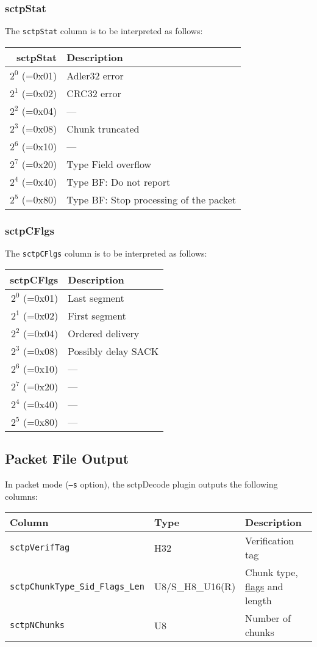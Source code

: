 \documentclass[documentation]{subfiles}
\begin{document}
\subsubsection{sctpStat}\label{sctpStat}
The {\tt sctpStat} column is to be interpreted as follows:
\begin{longtable}{rl}
    \toprule
    {\bf sctpStat} & {\bf Description}\\
    \midrule\endhead%
    $2^0$ (=0x01) & Adler32 error \\
    $2^1$ (=0x02) & CRC32 error\\
    $2^2$ (=0x04) & ---\\
    $2^3$ (=0x08) & Chunk truncated\\
    $2^6$ (=0x10) & ---\\
    $2^7$ (=0x20) & Type Field overflow\\
    $2^4$ (=0x40) & Type BF: Do not report\\
    $2^5$ (=0x80) & Type BF: Stop processing of the packet\\
    \bottomrule
\end{longtable}

\subsubsection{sctpCFlgs}\label{sctpCFlgs}
The {\tt sctpCFlgs} column is to be interpreted as follows:
\begin{longtable}{rl}
    \toprule
    {\bf sctpCFlgs} & {\bf Description}\\
    \midrule\endhead%
    $2^0$ (=0x01) & Last segment \\
    $2^1$ (=0x02) & First segment \\
    $2^2$ (=0x04) & Ordered delivery \\
    $2^3$ (=0x08) & Possibly delay SACK \\
    $2^6$ (=0x10) & --- \\
    $2^7$ (=0x20) & --- \\
    $2^4$ (=0x40) & --- \\
    $2^5$ (=0x80) & --- \\
    \bottomrule
\end{longtable}

\subsection{Packet File Output}
In packet mode ({\tt --s} option), the sctpDecode plugin outputs the following columns:
\begin{longtable}{lll}
    \toprule
    {\bf Column} & {\bf Type} & {\bf Description}\\
    \midrule\endhead%
    {\tt sctpVerifTag}                   & H32              & Verification tag\\
    {\tt sctpChunkType\_Sid\_Flags\_Len} & U8/S\_H8\_U16(R) & Chunk type, \hyperref[sctpCFlgs]{flags} and length\\
    {\tt sctpNChunks}                    & U8               & Number of chunks\\
    \bottomrule
\end{longtable}
\end{document}

